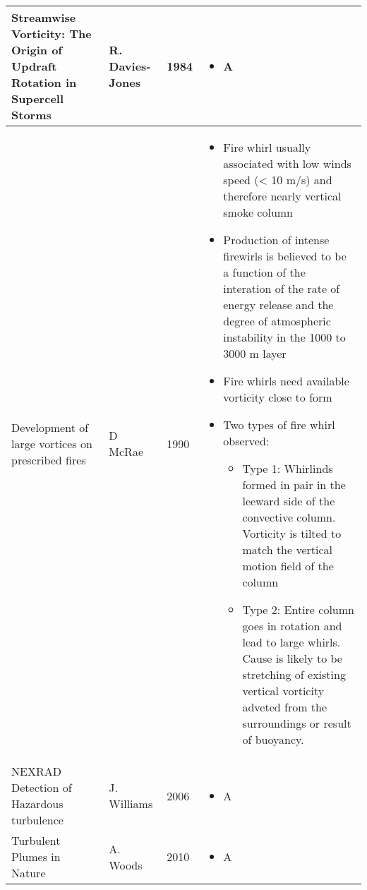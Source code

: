 \documentclass[12pt]{article}
\begin{document}
\begin{center}
\begin{longtable}{|p{4.5cm}|p{2cm}|p{0.8cm}|p{7.5cm}|}
\hline

\raggedright Streamwise Vorticity: The Origin of Updraft Rotation in Supercell Storms  & R. Davies-Jones & 1984 & \raggedleft 
\begin{itemize} 
\item A
\end{itemize} 
\tabularnewline

\hline 


\raggedright Development of large vortices on prescribed fires & D McRae & 1990 & \raggedleft 
\begin{itemize} 
\item Fire whirl usually associated with low winds speed (< 10 m/s) and therefore nearly vertical smoke column		
\item Production of intense firewirls is believed to be a function of the interation of the rate of energy release and the degree of atmospheric instability in the 1000 to 3000 m layer
\item Fire whirls need available vorticity close to form
\item Two types of fire whirl observed: 
	\begin{itemize}
	\item Type 1: Whirlinds formed in pair in the leeward side of the convective column. Vorticity is tilted to match the vertical motion field of the column
	\item Type 2: Entire column goes in rotation and lead to large whirls. Cause is likely to be stretching of existing vertical vorticity adveted from the surroundings or result of buoyancy.
	\end{itemize}
\end{itemize} 
\tabularnewline

\hline


\raggedright NEXRAD Detection of Hazardous turbulence & J. Williams & 2006 & \raggedleft 
\begin{itemize} 
\item A
\end{itemize} 
\tabularnewline

\hline


\raggedright Turbulent Plumes in Nature & A. Woods & 2010 & \raggedleft 
\begin{itemize} 
\item A
\end{itemize} 
\tabularnewline

\hline




\end{longtable}
\end{center}
\end{document}
